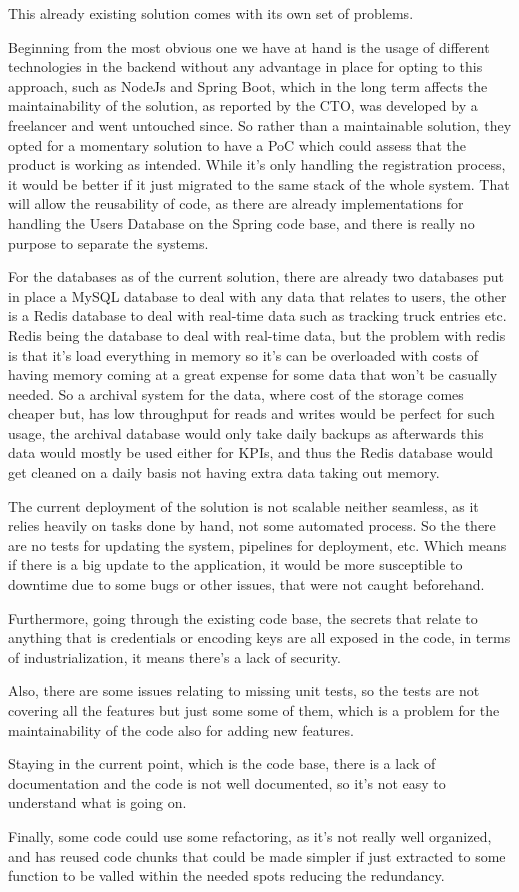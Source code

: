 This already existing solution comes with its own set of problems.

Beginning from the most obvious one we have at hand is the usage of different technologies
in the backend without any advantage in place for opting to this approach, such as NodeJs
and Spring Boot, which in the long term affects the maintainability of the solution, as
reported by the CTO, was developed by a freelancer and went untouched since. So rather
than a maintainable solution, they opted for a momentary solution to have a PoC which
could assess that the product is working as intended.
While it's only handling the registration process, it would be better if it just migrated
to the same stack of the whole system. That will allow the reusability of code,
as there are already implementations for handling the Users Database on the Spring code
base, and there is really no purpose to separate the systems.

For the databases as of the current solution, there are already two databases put in place
a MySQL database to deal with any data that relates to users, the other is a Redis database
to deal with real-time data such as tracking truck entries etc. Redis being the database to
deal with real-time data, but the problem with redis is that it's load everything in memory
so it's can be overloaded with costs of having memory coming at a great expense for some
data that won't be casually needed. So a archival system for the data, where cost of the
storage comes cheaper but, has low throughput for reads and writes would be perfect for
such usage, the archival database would only take daily backups as afterwards this data
would mostly be used either for KPIs, and thus the Redis database would get cleaned on
a daily basis not having extra data taking out memory.

The current deployment of the solution is not scalable neither seamless, as it 
relies heavily on tasks done by hand, not some automated process.
So the there are no tests for updating the system, pipelines for deployment, etc. Which
means if there is a big update to the application, it would be more susceptible to
downtime due to some bugs or other issues, that were not caught beforehand.

Furthermore, going through the existing code base, the secrets that relate to anything
that is credentials or encoding keys are all exposed in the code, in terms of
industrialization, it means there's a lack of security.

Also, there are some issues relating to missing  unit tests,
so the tests are not covering all the features but just some some of them,
which is a problem for the maintainability of the code also for adding new features.

Staying in the current point, which is the code base, there is a lack of documentation
and the code is not well documented, so it's not easy to understand what is going on.

Finally, some code could use some refactoring, as it's not really well organized,
and has reused code chunks that could be made simpler if just extracted to some function 
to be valled within the needed spots reducing the redundancy.

